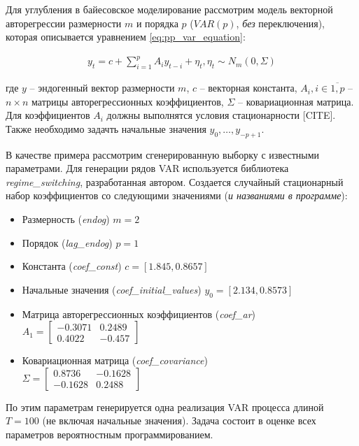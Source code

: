 \documentclass[a4paper,14pt]{extreport}
\begin{document}
Для углубления в байесовское моделирование рассмотрим модель векторной авторегрессии размерности $m$ и порядка $p$ ($VAR(p)$, \textit{без} переключения), которая описывается уравнением \ref{eq:pp_var_equation}:

\begin{equation}
	\begin{multlined}
		y_t = c + \sum\limits_{i=1}^{p}{A_{i}y_{t-i}} + \eta_t , 
		\eta_t \sim N_m(0, \Sigma)
	\end{multlined}
	\label{eq:pp_var_equation}
\end{equation}

\noindent
где $y$ -- эндогенный вектор размерности $m$, $c$ -- векторная константа, $A_i, i\in\overline{1,p}$ -- $n \times n$ матрицы авторегрессионных коэффициентов, $\Sigma$ -- ковариационная матрица. Для коэффициентов $A_i$ должны выполнятся условия стационарности [CITE]. Также необходимо задачть начальные значения ${y_{0}, \dots, y_{-p+1}}$. 

В качестве примера рассмотрим сгенерированную выборку с известными параметрами. Для генерации рядов VAR используется библиотека \textit{regime\_switching}, разработанная автором. Создается случайный стационарный набор коэффициентов со следующими значениями (\textit{и названиями в программе}):

\begin{itemize}
	\item Размерность (\textit{endog}) $m=2$
	\item Порядок (\textit{lag\_endog}) $p=1$
	\item Константа (\textit{coef\_const}) $c=[1.845, 0.8657]$
	\item Начальные значения (\textit{coef\_initial\_values}) $y_0=[2.134, 0.8573]$
	\item Матрица авторегрессионных коэффициентов (\textit{coef\_ar}) \\ $ A_1 = \begin{bmatrix} -0.3071 & 0.2489 \\ 0.4022 & -0.457 \end{bmatrix} $
	\item Ковариационная матрица (\textit{coef\_covariance}) \\ $ \Sigma = \begin{bmatrix} 0.8736 & -0.1628 \\ -0.1628 & 0.2488 \end{bmatrix} $
\end{itemize}

По этим параметрам генерируется одна реализация VAR процесса длиной $T=100$ (не включая начальные значения). Задача состоит в оценке всех параметров вероятностным программированием.
\end{document}

